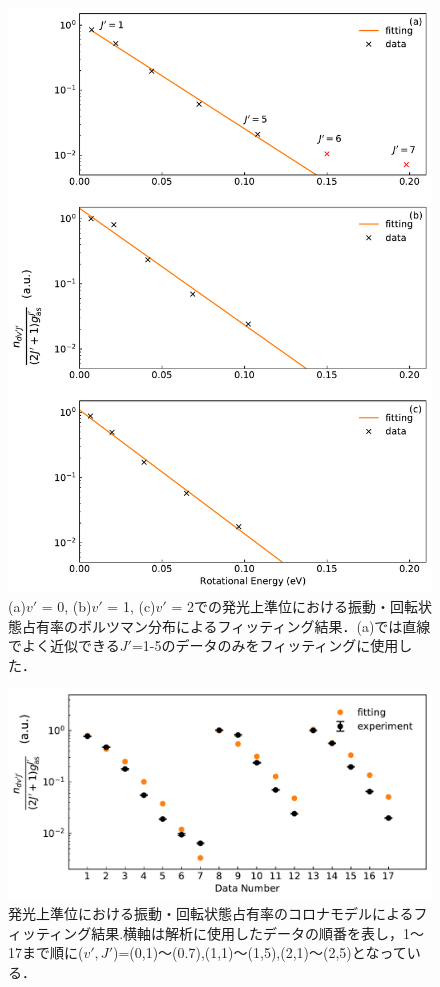 \begin{figure}
    \centering
    \includegraphics[width=15cm]{pictures/upper-fitting.pdf}
    \caption[発光上準位における振動・回転状態占有率のボルツマン分布によるフィッティング結果($v'=0$)]{(a)$v'$ = 0, (b)$v'$ = 1, (c)$v'$ = 2での発光上準位における振動・回転状態占有率のボルツマン分布によるフィッティング結果．(a)では直線でよく近似できる$J'$=1-5のデータのみをフィッティングに使用した．}
    \label{fig:upper-fitting}
\end{figure}

\begin{figure}
    \centering
    \includegraphics[width=15cm]{pictures/fitting-result.pdf}
    \caption[発光上準位における振動・回転状態占有率のコロナモデルによるフィッティング結果]{発光上準位における振動・回転状態占有率のコロナモデルによるフィッティング結果.横軸は解析に使用したデータの順番を表し，1〜17まで順に($v',J'$)=(0,1)〜(0.7),(1,1)〜(1,5),(2,1)〜(2,5)となっている．}
    \label{fig:fitting-result}
\end{figure}

